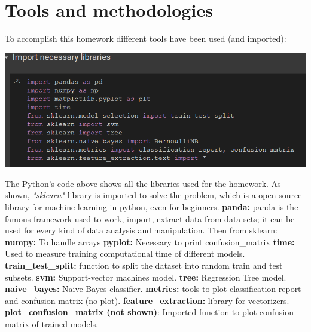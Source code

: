 \documentclass[11pt]{scrartcl}
\begin{document}
\section{Tools and methodologies}
\noindent
\large{To accomplish this homework different tools have been used (and imported):}

\vspace{0.4cm}
\hspace{-0.1in}\includegraphics[width=1\textwidth]{import.png}
\vspace{0.3cm}

\noindent
\large{The Python's code above shows all the libraries used for the homework. As shown, \textit{"sklearn"} library is imported to solve the problem, which is a open-source library for machine learning in python, even for beginners. \newline
\textbf{panda:} panda is the famous framework used to work, import, extract data from data-sets; it can be used for every kind of data analysis and manipulation. \newline
Then from sklearn: \newline
\textbf{numpy:} To handle arrays \newline
\textbf{pyplot:} Necessary to print confusion\_matrix \newline
\textbf{time:} Used to measure training computational time of different models. \newline
\textbf{train\_test\_split:} function to split the dataset into random train and test subsets. \newline
\textbf{svm:} Support-vector machines model. \newline
\textbf{tree:} Regression Tree model. \newline
\textbf{naive\_bayes:} Naive Bayes classifier. \newline
\textbf{metrics:} tools to plot classification report and confusion matrix (no plot). \newline
\textbf{feature\_extraction:} library for vectorizers. \newline
\textbf{plot\_confusion\_matrix (not shown)}: Imported function to plot confusion matrix of trained models.
}
\end{document}
